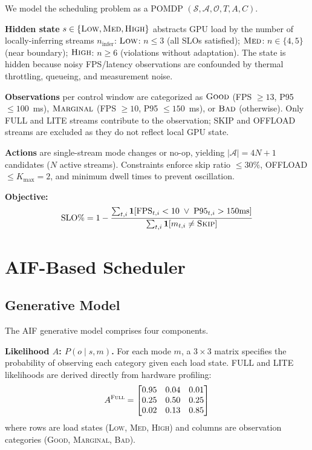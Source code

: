 \documentclass[conference]{IEEEtran}
\begin{document}
We model the scheduling problem as a POMDP $(\mathcal{S}, \mathcal{A}, \mathcal{O}, T, A, C)$.

\textbf{Hidden state} $s \in \{\textsc{Low}, \textsc{Med}, \textsc{High}\}$ abstracts GPU load by the number of locally-inferring streams $n_{\text{infer}}$:
$\textsc{Low}$: $n \leq 3$ (all SLOs satisfied);
$\textsc{Med}$: $n \in \{4,5\}$ (near boundary);
$\textsc{High}$: $n \geq 6$ (violations without adaptation).
The state is hidden because noisy FPS/latency observations are confounded by thermal throttling, queueing, and measurement noise.

\textbf{Observations} per control window are categorized as $\textsc{Good}$ (FPS $\geq 13$, P95 $\leq 100$~ms), $\textsc{Marginal}$ (FPS $\geq 10$, P95 $\leq 150$~ms), or $\textsc{Bad}$ (otherwise).
Only FULL and LITE streams contribute to the observation; SKIP and OFFLOAD streams are excluded as they do not reflect local GPU state.

\textbf{Actions} are single-stream mode changes or no-op, yielding $|\mathcal{A}| = 4N + 1$ candidates ($N$ active streams).
Constraints enforce skip ratio $\leq 30\%$, OFFLOAD $\leq K_{\max}=2$, and minimum dwell times to prevent oscillation.

\textbf{Objective:}
\begin{equation}
    \text{SLO\%} = 1 - \frac{\sum_{t,i} \mathbf{1}[\text{FPS}_{t,i} < 10 \;\lor\; \text{P95}_{t,i} > 150\text{ms}]}{\sum_{t,i} \mathbf{1}[m_{t,i} \neq \textsc{Skip}]}
    \label{eq:slo}
\end{equation}

\section{AIF-Based Scheduler}
\label{sec:method}

\subsection{Generative Model}

The AIF generative model comprises four components.

\textbf{Likelihood $A$: $P(o \mid s, m)$.}
For each mode $m$, a $3{\times}3$ matrix specifies the probability of observing each category given each load state.
FULL and LITE likelihoods are derived directly from hardware profiling:
\begin{equation}
    A^{\textsc{Full}} = \begin{bmatrix}
        0.95 & 0.04 & 0.01 \\
        0.25 & 0.50 & 0.25 \\
        0.02 & 0.13 & 0.85
    \end{bmatrix}
\end{equation}
where rows are load states (\textsc{Low}, \textsc{Med}, \textsc{High}) and columns are observation categories (\textsc{Good}, \textsc{Marginal}, \textsc{Bad}).
\end{document}
